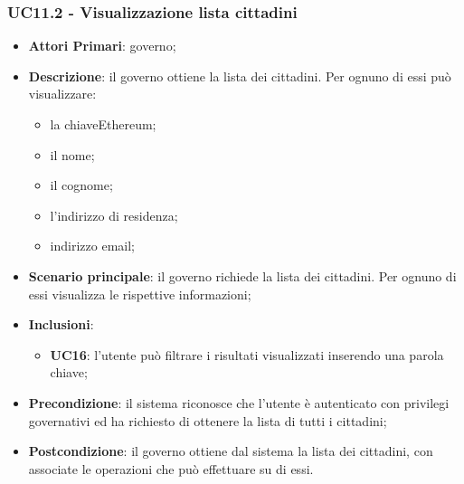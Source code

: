 \subsubsection{UC11.2 - Visualizzazione lista cittadini}
\begin{itemize}
	\item \textbf{Attori Primari}: governo;
	\item \textbf{Descrizione}: il governo ottiene la lista dei cittadini. Per ognuno di essi può visualizzare:
	\begin{itemize}
		\item la chiave\glosp Ethereum\glo;
		\item il nome;
		\item il cognome;
		\item l'indirizzo di residenza;
		\item indirizzo email;
	\end{itemize}
	\item \textbf{Scenario principale}: il governo richiede la lista dei cittadini. Per ognuno di essi visualizza le rispettive informazioni;
	\item \textbf{Inclusioni}:
	\begin{itemize}
		\item \textbf{UC16}: l'utente può filtrare i risultati visualizzati inserendo una parola chiave;
	\end{itemize}
	\item \textbf{Precondizione}: il sistema riconosce che l'utente è autenticato con privilegi governativi ed ha richiesto di ottenere la lista di tutti i cittadini;
	\item \textbf{Postcondizione}: il governo ottiene dal sistema la lista dei cittadini, con associate le operazioni che può effettuare su di essi.
\end{itemize}


